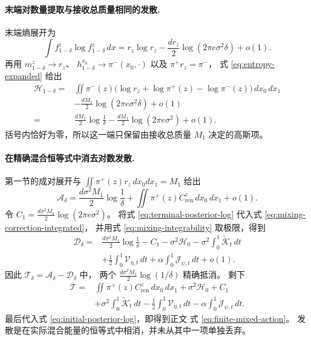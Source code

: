 \documentclass[UTF8,a4paper,11pt,fontset=fandol]{ctexart}
\begin{document}
\paragraph{末端对数量提取与接收总质量相同的发散.}
末端熵展开为
\begin{equation}
\int f_{1-\delta}^z\log f_{1-\delta}^z\,dx
=r_z\log r_z-\frac{d r_z}{2}\log(2\pi e\sigma^2\delta)+o(1).
\end{equation}
再用 $m_{1-\delta}^z\to r_z$、
$h_{1-\delta}^{x_0}\to\pi^-(x_0,\cdot)$ 以及 $\pi^+r_z=\pi^-$，
式 \eqref{eq:entropy-expanded} 给出
\begin{equation}
\begin{aligned}
\mathcal H_{1-\delta}
={}&\iint\pi^-(z)
\bigl(\log r_z+\log\pi^+(z)-\log\pi^-(z)\bigr)\,dx_0\,dx_1\\
&-\frac{dM_1}{2}\log(2\pi e\sigma^2\delta)+o(1)\\
={}&\frac{dM_1}{2}\log\frac1\delta
-\frac{dM_1}{2}\log(2\pi e\sigma^2)+o(1).
\end{aligned}
\label{eq:terminal-posterior-log}
\end{equation}
括号内恰好为零，所以这一端只保留由接收总质量 $M_1$ 决定的高斯项。

\paragraph{在精确混合恒等式中消去对数发散.}
第一节的成对展开与 $\iint\pi^+(z)r_z\,dx_0dx_1=M_1$ 给出
\begin{equation}
\mathcal A_\delta
=\frac{d\sigma^2M_1}{2}\log\frac1\delta
+\iint\pi^+(z)C_{\mathrm{ren}}^z\,dx_0\,dx_1+o(1).
\label{eq:total-bare-divergence}
\end{equation}
令
$C_1=\frac{d\sigma^2M_1}{2}\log(2\pi e\sigma^2)$。
将式 \eqref{eq:terminal-posterior-log} 代入式 \eqref{eq:mixing-correction-integrated}，
并用式 \eqref{eq:mixing-integrability} 取极限，得到
\begin{equation}
\begin{aligned}
\mathcal D_\delta
={}&\frac{d\sigma^2M_1}{2}\log\frac1\delta
-C_1-\sigma^2\mathcal H_0
-\sigma^2\int_0^1\widetilde{\mathcal K}_t\,dt\\
&+\frac12\int_0^1\mathcal V_{\eta,t}\,dt
+\alpha\int_0^1\mathcal J_{\psi,t}\,dt+o(1).
\end{aligned}
\label{eq:mixing-divergence}
\end{equation}
因此 $\mathcal T_\delta=\mathcal A_\delta-\mathcal D_\delta$ 中，
两个 $\frac{d\sigma^2M_1}{2}\log(1/\delta)$ 精确抵消。
剩下
\begin{equation}
\begin{aligned}
\mathcal T
={}&\iint\pi^+(z)C_{\mathrm{ren}}^z\,dx_0\,dx_1
+\sigma^2\mathcal H_0+C_1\\
&+\sigma^2\int_0^1\widetilde{\mathcal K}_t\,dt
-\frac12\int_0^1\mathcal V_{\eta,t}\,dt
-\alpha\int_0^1\mathcal J_{\psi,t}\,dt.
\end{aligned}
\end{equation}
最后代入式 \eqref{eq:initial-posterior-log}，即得到正文
式 \eqref{eq:finite-mixed-action}。
发散是在实际混合能量的恒等式中相消，并未从其中一项单独丢弃。
\end{document}
